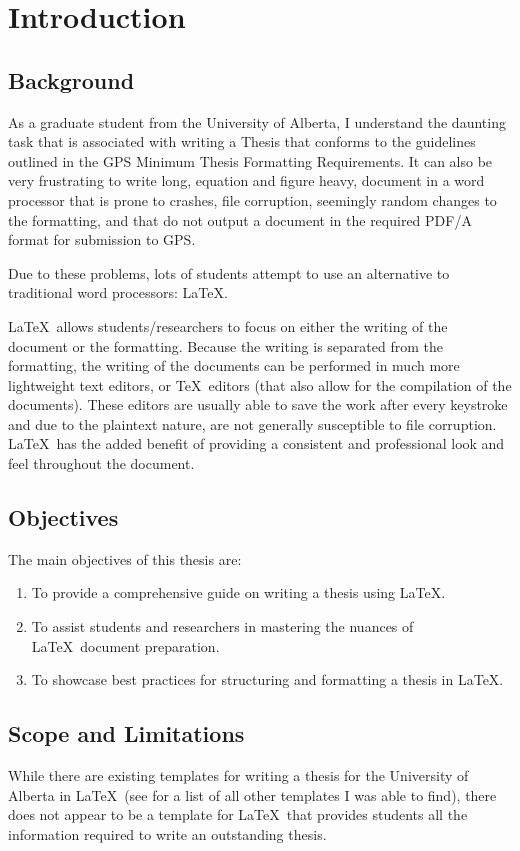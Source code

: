\chapter{Introduction}\label{ch:Introduction}\section{Background}
	As a graduate student from the University of Alberta, I understand the daunting task that is associated with writing a Thesis that conforms to the guidelines outlined in the GPS Minimum Thesis Formatting Requirements. 
	It can also be very frustrating to write long, equation and figure heavy, document in a word processor that is prone to crashes, file corruption, seemingly random changes to the formatting, and that do not output a document in the required PDF/A format for submission to GPS.
	
	Due to these problems, lots of students attempt to use an alternative to traditional word processors: \LaTeX. 
	
	\LaTeX\ allows students/researchers to focus on either the writing of the document or the formatting. 
	Because the writing is separated from the formatting, the writing of the documents can be performed in much more lightweight text editors, or \TeX\ editors (that also allow for the compilation of the documents). 
	These editors are usually able to save the work after every keystroke and due to the plaintext nature, are not generally susceptible to file corruption.
	\LaTeX\ has the added benefit of providing a consistent and professional look and feel throughout the document. 

	\section{Objectives}
		The main objectives of this thesis are:
		\begin{enumerate}
			\item To provide a comprehensive guide on writing a thesis using \LaTeX.
			\item To assist students and researchers in mastering the nuances of \LaTeX\ document preparation.
			\item To showcase best practices for structuring and formatting a thesis in \LaTeX.
		\end{enumerate}

	\section{Scope and Limitations}
		While there are existing templates for writing a thesis for the University of Alberta in \LaTeX\ (see  for a list of all other templates I was able to find), there does not appear to be a template for \LaTeX\ that provides students all the information required to write an outstanding thesis.
		
